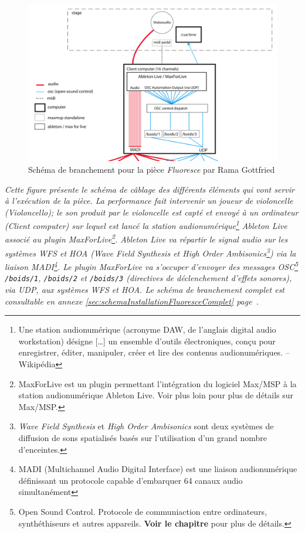 \begin{figure}[H]
	\centering
	\includegraphics[keepaspectratio=true, width=\textwidth]{Notation/i/schemaInstallationFluoresce.png}
	\caption[Schéma de branchement pour la pièce \textit{Fluoresce} par Rama Gottfried]{Schéma de branchement pour la pièce \textit{Fluoresce} par Rama Gottfried}
	\label{fig:schemaInstallationFluoresce}			
\end{figure}
\begin{center}
\small \it Cette figure présente le schéma de câblage des différents éléments qui vont servir à l'exécution de la pièce. La performance fait intervenir un joueur de violoncelle (\textit{Violoncello}); le son produit par le violoncelle est capté et envoyé à un ordinateur (\textit{Client computer}) sur lequel est lancé la station audionumérique\footnote{Une station audionumérique (acronyme DAW, de l'anglais digital audio workstation) désigne […] un ensemble d'outils électroniques, conçu pour enregistrer, éditer, manipuler, créer et lire des contenus audionumériques. -- Wikipédia} \textit{Ableton Live} associé au plugin \textit{MaxForLive}\footnote{MaxForLive est un plugin permettant l'intégration du logiciel Max/MSP à la station audionumérique Ableton Live. Voir plus loin pour plus de détails sur Max/MSP.}. Ableton Live va répartir le signal audio sur les systèmes WFS et HOA (\textit{Wave Field Synthesis} et \textit{High Order Ambisonics}\footnote{\textit{Wave Field Synthesis} et \textit{High Order Ambisonics} sont deux systèmes de diffusion de sons spatialisés basés sur l'utilisation d'un grand nombre d'enceintes.}) via la liaison MADI\footnote{MADI (Multichannel Audio Digital Interface) est une liaison audionumérique définissant un protocole capable d'embarquer 64 canaux audio simultanément}. Le plugin MaxForLive va s'occuper d'envoyer des messages OSC\footnote{Open Sound Control. Protocole de communiaction entre ordinateurs, synthéthiseurs et autres appareils. \textbf{Voir le chapitre} pour plus de détails.} \texttt{/boids/1}, \texttt{/boids/2} et \texttt{/boids/3} (directives de déclenchement d'effets sonores), via UDP, aux systèmes WFS et HOA. Le schéma de branchement complet est consultable en annexe \ref{sec:schemaInstallationFluoresceComplet} page~\pageref{sec:schemaInstallationFluoresceComplet}.
\end{center}

